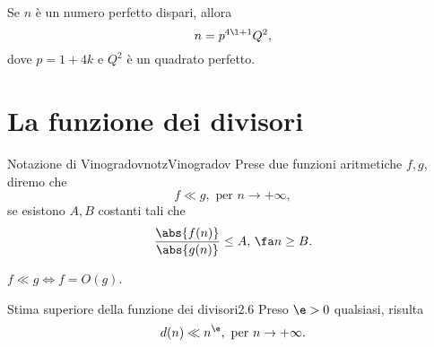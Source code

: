 \begin{pr*}
	Se \(n\) è un numero perfetto dispari, allora
	\[
		n=p^{4\l+1}Q^2,
	\]
	dove \(p=1+4k\) e \(Q^2\) è un quadrato perfetto.
\end{pr*}
\section{La funzione dei divisori}

\begin{defn}{Notazione di Vinogradov}{notzVinogradov}
	Prese due funzioni aritmetiche \(f,g\), diremo che
	\[
		f\ll g,\text{ per }n\to+\infty,
	\]
	se esistono \(A,B\) costanti tali che
	\[
		\frac{\abs{f(n)}}{\abs{g(n)}}\le A,\,\fa n\ge B.
	\]
\end{defn}

\begin{oss}
	\(f\ll g\iff f=O(g)\).
\end{oss}

\begin{teor}{Stima superiore della funzione dei divisori}{2.6}
	Preso \(\e>0\) qualsiasi, risulta
	\[
		d(n)\ll n^\e,\text{ per }n\to+\infty.
	\]
\end{teor}

